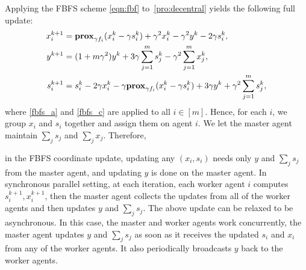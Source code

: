 Applying the FBFS scheme \eqref{eqn:fbf} to~\eqref{pro:decentral} yields the following full update:
\begin{subequations}
\begin{align}
x_i^{k+1} &= \prox_{\gamma f_i}(x_i^k-\gamma s_i^k)+\gamma^2 x_i^{k}-\gamma^2 y^k-2\gamma s_i^k, \label{fbfs_a} \\
y^{k+1} &= (1+m\gamma^2)y^k +3\gamma \sum_{j=1}^m s_j^k -\gamma^2 \sum_{j=1}^m x_j^k,\\
s_i^{k+1} &= s_i^k-2\gamma x_i^k-\gamma \prox_{\gamma f_i}(x_i^k-\gamma s_i^k)+3\gamma y^k+ \gamma^2 \sum_{j=1}^m s_j^k, \label{fbfs_c}
\end{align}
\end{subequations}
where \eqref{fbfs_a} and \eqref{fbfs_c} are applied to all $i\in[m]$.
Hence, for each $i$, we group  $x_i$ and $s_i$ together and assign them on agent $i$.  {We let the master agent } maintain $\sum_j s_j$ and $\sum_j x_j$. Therefore, {in the FBFS coordinate update, updating any $(x_i,s_i)$ needs only $y$ and $\sum_j s_j$ from the master agent, and updating $y$ is done on the master agent. In synchronous parallel setting, at each iteration, each worker agent $i$ computes $s_i^{k+1}, x_i^{k+1}$, then the master agent collects the updates from all of the worker agents and then updates $y$ and $\sum_j s_j$. The above update can be relaxed to be asynchronous. In this case, the master and worker agents work concurrently, the master agent updates $y$ and $\sum_j s_j$ as soon as it receives the updated $s_i$ and $x_i$ from any of the worker agents. It also periodically broadcasts $y$ back to the worker agents.


}
